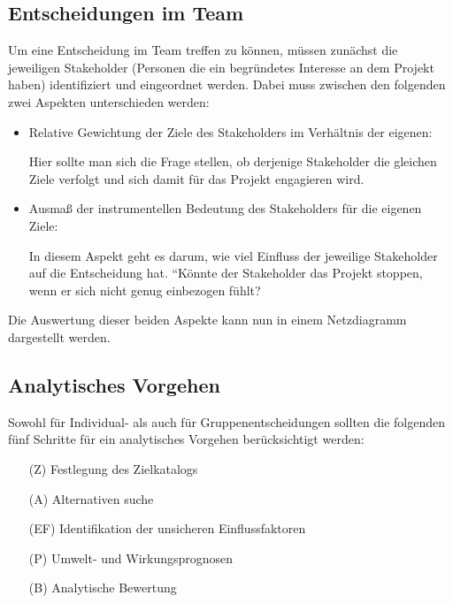 \documentclass[12pt,a4paper]{scrartcl}
\begin{document}
\subsection{Entscheidungen im Team}
Um eine Entscheidung im Team treffen zu können, müssen zunächst die jeweiligen Stakeholder (Personen die ein begründetes Interesse an dem Projekt haben) identifiziert und eingeordnet werden. Dabei muss zwischen den folgenden zwei Aspekten unterschieden werden:
\begin{itemize}
	\item Relative Gewichtung der Ziele des  Stakeholders im Verhältnis der eigenen:

	Hier sollte man sich die Frage stellen, ob derjenige Stakeholder die gleichen Ziele verfolgt und sich damit für das Projekt engagieren wird.

	\item Ausmaß der instrumentellen Bedeutung des Stakeholders für die eigenen Ziele:

	In diesem Aspekt geht es darum, wie viel Einfluss der jeweilige Stakeholder auf die Entscheidung hat. ``Könnte der Stakeholder das Projekt stoppen, wenn er sich nicht genug einbezogen fühlt?\grqq
\end{itemize}
Die Auswertung dieser beiden Aspekte kann nun in einem Netzdiagramm dargestellt werden.

\subsection{Analytisches Vorgehen \cite{vonNitzsch:211553}}
Sowohl für Individual- als auch für Gruppenentscheidungen sollten die folgenden fünf Schritte für ein analytisches Vorgehen berücksichtigt werden:
\begin{enumerate}
	\item[(Z)] Festlegung des Zielkatalogs
	\item[(A)] Alternativen suche
	\item[(EF)] Identifikation der unsicheren Einflussfaktoren
	\item[(P)] Umwelt- und Wirkungsprognosen
	\item[(B)] Analytische Bewertung
\end{enumerate}
\end{document}
